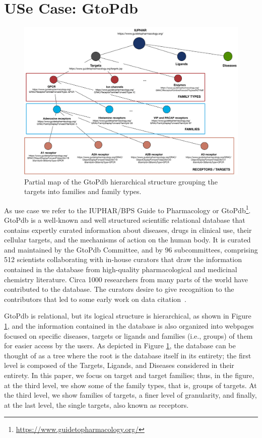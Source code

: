\section{USe Case: GtoPdb}
\label{section:use_case}

\begin{figure}[]
\centering
  \includegraphics[width=.9\textwidth]{figures/iuphar_schema}
  \caption{Partial map of the GtoPdb hierarchical structure grouping the targets into families and family types.}
  \label{figure:iuphar_schema}
\end{figure}

As use case we refer to the IUPHAR/BPS Guide to Pharmacology \citep{iuphar2018} or  GtoPdb\footnote{\url{https://www.guidetopharmacology.org/}}.
GtoPdb is a well-known and well structured scientific relational database that contains expertly curated information about diseases, drugs in clinical use, their cellular targets, and the mechanisms of action on the human body. 
It is curated and maintained by the GtoPdb Committee, and by 96 subcommittees, comprising 512 scientists collaborating with in-house curators that draw the information contained in the database from high-quality pharmacological and medicinal chemistry literature.
Circa 1000 researchers from many parts of the world have contributed to the database. The curators desire to give recognition to the contributors that led to some early work on data citation~\citep{buneman2006cite}.  

GtoPdb is relational, but its logical structure is hierarchical, as shown in Figure \ref{figure:iuphar_schema}, and the information contained in the database is also organized into webpages focused on specific diseases, targets or ligands and families (i.e., groups) of them for easier access by the users. 
As depicted in Figure \ref{figure:iuphar_schema}, the database can be thought of as a tree where the root is the database itself in its entirety; the first level is composed of the Targets, Ligands, and Diseases considered in their entirety. 
In this paper, we focus on target and target families; thus, in the figure, at the third level, we show some of the family types, that is, groups of targets. At the third level, we show families of targets, a finer level of granularity, and finally, at the last level, the single targets, also known as receptors. 

